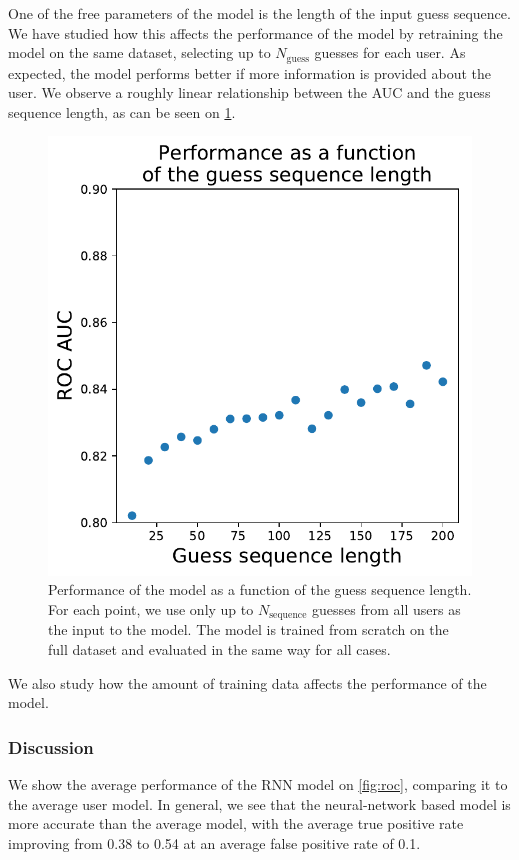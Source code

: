 One of the free parameters of the model is the length of the input guess sequence. We have studied how this affects the performance of the model by retraining the model on the same dataset, selecting up to $N_{\mathrm{guess}}$ guesses for each user. As expected, the model performs better if more information is provided about the user. We observe a roughly linear relationship between the AUC and the guess sequence length, as can be seen on \cref{fig:seq_length}.

\begin{figure}[ht]
\centering
\includegraphics[width=0.5\linewidth]{figures/lingvist/seq_length.pdf}
\caption{Performance of the model as a function of the guess sequence length. For each point, we use only up to $N_{\mathrm{sequence}}$ guesses from all users as the input to the model. The model is trained from scratch on the full dataset and evaluated in the same way for all cases.} 
\label{fig:seq_length} 
\end{figure} 

We also study how the amount of training data affects the performance of the model.

\subsubsection{Discussion}

We show the average performance of the RNN model on \cref{fig:roc}, comparing it to the average user model. In general, we see that the neural-network based model is more accurate than the average model, with the average true positive rate improving from 0.38 to 0.54 at an average false positive rate of 0.1.


